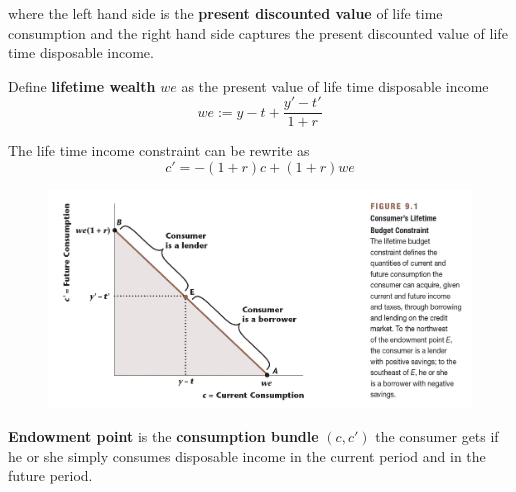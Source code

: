 \documentclass[11pt]{article}
\begin{document}
	where the left hand side is the \textbf{present discounted value} of life time consumption and the right hand side captures the present discounted value of life time disposable income.
	\begin{definition}
		Define \textbf{lifetime wealth} $we$ as the present value of life time disposable income
		\[
			we := y - t + \frac{y' - t'}{1 + r}
		\]
	\end{definition}
	
	The life time income constraint can be rewrite as
	\begin{equation}
		c' = -(1+r)c + (1+r)we
	\end{equation}
	\begin{figure}[h]
		\centering
		\includegraphics[width=\linewidth]{figures/91}
	\end{figure}
	
	\newpage
	\begin{definition}
		\textbf{Endowment point} is the \textbf{consumption bundle} $(c, c')$ the consumer gets if he or she simply consumes disposable income in the current period and in the future period.
	\end{definition}
	
\end{document}
